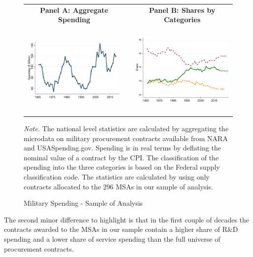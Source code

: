\documentclass[dv_diss_main.tex]{subfiles}
\begin{document}
\begin{figure}[ht]
    \begin{center}
        \begin{tabular}[c]{ccc}
    
    \normalsize{\bf Panel A: Aggregate Spending} & & \normalsize{\bf Panel B: Shares by Categories} \\
    {\includegraphics[height=1.8in,width=2.9in]{figures/graph_milspend_aggregate_sample.png}} & & {\includegraphics[height=1.8in,width=2.9in]{figures/graph_composition_shares_sample.png}} \\[0.1in]
    
    
    
    \end{tabular}
    \caption{Military Spending - Sample of Analysis}\label{fig:share_comp_sample}
    \end{center}
    
    
    \footnotesize{\textit{Note. } The national level statistics are calculated by aggregating the microdata on military procurement contracts available from NARA and USASpending.gov. Spending is in real terms by deflating the nominal value of a contract by the CPI. The classification of the spending into the three categories is based on the Federal supply classification code. The statistics are calculated by using only contracts allocated to the $296$ MSAs in our sample of analysis.}
\end{figure}

The second minor difference to highlight is that in the first couple of decades the contracts awarded to the MSAs in our sample contain a higher share of R\&D spending and a lower share of service spending than the full universe of procurement contracts.
\end{document}
